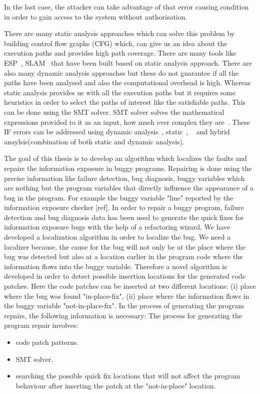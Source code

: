 In the last case, the attacker can take advantage of that error causing
condition in order to gain access to the system without authorisation.

There are many static analysis approaches which can solve this problem by building control flow graphs
(CFG) which, can give us an idea about the execution paths and provides high path coverage. There are 
many tools like ESP~\cite{Das:tool}, SLAM~\cite{Ball:tool} that have been built based on static
analysis approach. There are also
many dynamic analysis approaches but these do not guarantee if
all the paths have been analysed and
also the computational overhead is high. Whereas static analysis provides us with all the execution
paths but it requires some heuristics in order to select the paths of interest like the satisfiable paths.
This can be done using the SMT solver. SMT solver solves the mathematical expressions provided
to it as an input, how much ever complex they are~\cite{Cadar:SMT}. These IF errors can be 
addressed using dynamic analysis~\cite{Sabelfeld:dynamic}, static~\cite{Volpano:static}, 
~\cite{Myers:static} and hybrid anaylsis(combination of both static and dynamic analysis).

The goal of this thesis is to develop an algorithm which localizes 
the faults and repairs the information exposure in buggy programs. Repairing is done using the precise information like failure detection,
bug diagnosis, buggy variables which are nothing but the program variables that directly influence
the appearance of a bug in the program.
For example the buggy variable "line" reported by the information exposure checker [ref]. 
In order to 
repair a buggy program, failure detection and bug diagnosis data has been used to generate the quick fixes
for information exposure bugs with the help of a refactoring wizard. We have developed a localization algorithm 
in order to localize the bug. We need a localizer because, the cause
for the bug will not only be at the place where
the bug was detected but also at a location earlier in the program 
code where the information flows into the buggy variable.
Therefore a novel algorithm is developed in order to detect possible insertion locations for the generated code patches.
Here the code patches can be inserted at two different locations: (i) place where the bug was found \textthreequartersemdash "in-place-fix", (ii) place where the
information flows in the buggy variable \textthreequartersemdash  "not-in-place-fix". 
In the process of generating the program repairs, the following information is necessary:
The process for generating
the program repair involves:
\begin{itemize}
 \item code patch patterns.
 \item SMT solver.
 \item searching the possible quick fix locations that will not affect 
 the program behaviour after
 inserting the patch at the "not-in-place" location.
\end{itemize}
 
